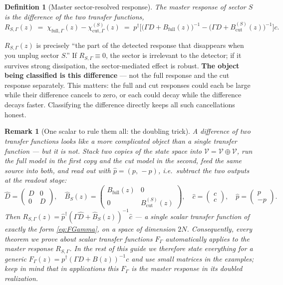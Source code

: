 \documentclass[11pt]{article}
\newtheorem{definition}{Definition}
\newtheorem{remark}{Remark}
\begin{document}
\begin{definition}[Master sector-resolved response]
The \emph{master response} of sector $S$ is the difference of the two
transfer functions,
\begin{equation}
R_{S,\Gamma}(z)\;=\;\chi_{\mathrm{full},\Gamma}(z)-\chi^{(S)}_{\mathrm{cut},\Gamma}(z)
\;=\;p^\dagger\Big[\big(\Gamma D+B_{\mathrm{full}}(z)\big)^{-1}
-\big(\Gamma D+B^{(S)}_{\mathrm{cut}}(z)\big)^{-1}\Big]c .
\label{eq:master}
\end{equation}
\end{definition}

$R_{S,\Gamma}(z)$ is precisely ``the part of the detected response that
disappears when you unplug sector $S$.''  If $R_{S,\Gamma}\equiv 0$, the
sector is irrelevant to the detector; if it survives strong dissipation, the
sector-mediated effect is robust.  \textbf{The object being classified is
this difference} --- not the full response and the cut response separately.
This matters: the full and cut responses could each be large while their
difference cancels to zero, or each could decay while the difference decays
faster.  Classifying the difference directly keeps all such cancellations
honest.

\begin{remark}[One scalar to rule them all: the doubling trick]
A difference of two transfer functions looks like a more complicated object
than a single transfer function --- but it is not.  Stack two copies of the
state space into $\hat{\mathcal V}=\mathcal V\oplus\mathcal V$, run the full
model in the first copy and the cut model in the second, feed the same source
into both, and read out with $\hat p=(p,\,-p)$, i.e.\ \emph{subtract} the two
outputs at the readout stage:
\[
\hat D=\begin{pmatrix}D&0\\0&D\end{pmatrix},\quad
\hat B_S(z)=\begin{pmatrix}B_{\mathrm{full}}(z)&0\\0&B^{(S)}_{\mathrm{cut}}(z)\end{pmatrix},\quad
\hat c=\begin{pmatrix}c\\ c\end{pmatrix},\quad
\hat p=\begin{pmatrix}p\\ -p\end{pmatrix}.
\]
Then $R_{S,\Gamma}(z)=\hat p^\dagger(\Gamma\hat D+\hat B_S(z))^{-1}\hat c$
--- a single scalar transfer function of exactly the form
\eqref{eq:FGamma}, on a space of dimension $2N$.  Consequently, every theorem
we prove about scalar transfer functions $F_\Gamma$ automatically applies to
the master response $R_{S,\Gamma}$.  In the rest of this guide we therefore
state everything for a generic $F_\Gamma(z)=p^\dagger(\Gamma D+B(z))^{-1}c$
and use small matrices in the examples; keep in mind that in applications
this $F_\Gamma$ \emph{is} the master response in its doubled realization.
\end{remark}
\end{document}
